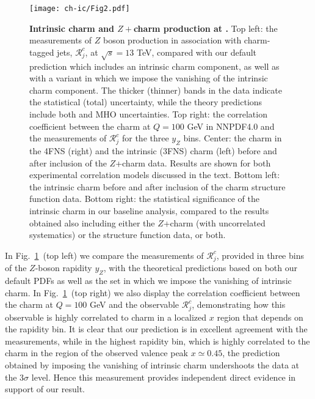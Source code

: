 \begin{figure}[htbp]
  \begin{center}
    \texttt{[image: ch-ic/Fig2.pdf]}
     \caption{\small
       \textbf{ Intrinsic charm and $Z+$charm production at \lhcb.}
       Top left: the \lhcb measurements of $Z$ boson production
      in association with charm-tagged jets, $\mathcal{R}_j^c$, at $\sqrt{s}=13$ TeV,  compared with
      our default prediction which includes an intrinsic charm component,
      as well as with a variant in which we impose the
      vanishing of the intrinsic charm component.
       The thicker (thinner) bands in the \lhcb data indicate the statistical
      (total) uncertainty, while the theory predictions include both \pdf and MHO uncertainties.
      Top right: the correlation coefficient between
     the  charm \pdf at $Q=100$ GeV in NNPDF4.0
      and the \lhcb measurements of $\mathcal{R}_j^c$ 
     for the three $y_Z$ bins.
     Center: the charm \pdf
     in the 4FNS (right) and the intrinsic (3FNS) charm \pdf (left)
     before and after inclusion of the \lhcb $Z$+charm data.
     Results are shown
     for both experimental correlation models discussed in the text.
     Bottom left: the intrinsic charm \pdf before and after inclusion
     of the \emc charm structure function data.
     Bottom right: the statistical significance of the
     intrinsic charm \pdf in our baseline analysis, compared to the results
     obtained also including either the \lhcb $Z$+charm (with uncorrelated
     systematics) or the \emc
     structure function data, or both.
  \label{fig:ic/Zc} }
\end{center}
\end{figure}

In Fig.~\ref{fig:ic/Zc}~(top left) we compare the \lhcb measurements of $\mathcal{R}_j^c$, provided
in three bins of the $Z$-boson rapidity
$y_Z$, with the theoretical predictions
 based on both our default PDFs as well as the \pdf set in
 which we impose the vanishing of intrinsic charm.
 In Fig.~\ref{fig:ic/Zc}~(top right)
we also display the  correlation coefficient between
 the  charm \pdf at $Q=100$ GeV 
 and the observable  $\mathcal{R}_j^c$, demonstrating how this observable
 is highly
 correlated to charm in a localized
 $x$ region that depends on the rapidity bin.
 It is clear that
 our prediction is in excellent agreement with the \lhcb measurements, while in the
 highest rapidity bin, which is highly correlated to the charm \pdf in
 the region of the observed valence peak $x\simeq 0.45$, the prediction
 obtained by imposing the vanishing of intrinsic charm undershoots the
 data at the $3\sigma$ level.
%
 Hence this measurement provides
 independent direct evidence in support of our result.

